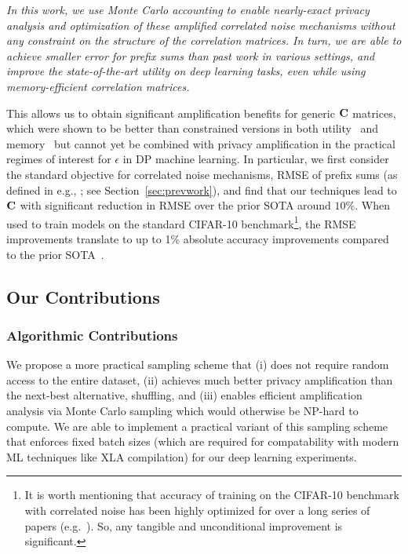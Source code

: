 \begin{center}
\textit{In this work, we use Monte Carlo accounting to enable nearly-exact privacy analysis and optimization of these amplified correlated noise mechanisms without any constraint on the structure of the correlation matrices. In turn, we are able to achieve smaller error for prefix sums than past work in various settings, and improve the state-of-the-art utility on deep learning tasks, even while using memory-efficient correlation matrices.}
\end{center}
This allows us to obtain significant amplification benefits for generic $\mathbf{C}$ matrices, which were shown to be better than constrained versions in both utility~\citep{choquette2022multi} and memory~\citep{dvijotham2024efficientnearoptimalnoisegeneration} but cannot yet be combined with privacy amplification in the practical regimes of interest for $\epsilon$ in DP machine learning. In particular, we first consider the standard objective for correlated noise mechanisms, RMSE of prefix sums (as defined in e.g., \citet{kairouz2021practical, denisov2022improved}; see Section~\ref{sec:prevwork}), and find that our techniques lead to $\mathbf{C}$ with significant reduction in RMSE over the prior SOTA around $10\%$. When used to train models on the standard CIFAR-10 benchmark\footnote{It is worth mentioning that accuracy of training on the CIFAR-10 benchmark with correlated noise has been highly optimized for over a long series of papers (e.g.~\citep{choquette2022multi,choquette2024amplified}). So, any tangible and unconditional improvement is significant.}, the RMSE improvements translate to up to 1\% absolute accuracy improvements compared to the prior SOTA~\citep{choquette2024amplified}.

\subsection{Our Contributions}
 
\subsubsection{Algorithmic Contributions}

 We propose a more practical sampling scheme that (i) does not require random access to the entire dataset, (ii) achieves much better privacy amplification than the next-best alternative, shuffling, and (iii) enables efficient amplification analysis via Monte Carlo sampling which would otherwise be NP-hard to compute. We are able to implement a practical variant of this sampling scheme that enforces fixed batch sizes (which are required for compatability with modern ML techniques like XLA compilation) for our deep learning experiments.

